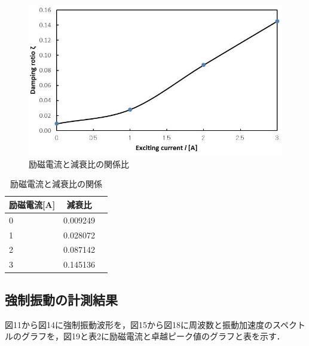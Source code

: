\documentclass[a4paper,10.5pt]{jsarticle}
\begin{document}
\begin{figure}[h]
  \centering
  \includegraphics[width=13cm]{6.png}
  \caption{励磁電流と減衰比の関係比}
\end{figure}
\newpage
\begin{table}[h]
  \centering
  \caption{励磁電流と減衰比の関係}
  \begin{tabular}{l|c|r}
    励磁電流[A]&減衰比\\\hline\hline
      0&0.009249 \\ \hline
      1&0.028072  \\
      2&0.087142  \\
      3&0.145136  \\\hline
  \end{tabular}
\end{table}


\subsection{強制振動の計測結果}
図11から図14に強制振動波形を，図15から図18に周波数と振動加速度のスペクトルのグラフを，図19と表2に励磁電流と卓越ピーク値のグラフと表を示す．
\end{document}
